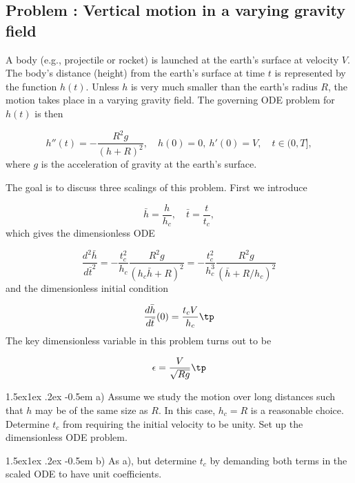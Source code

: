 \documentclass[graybox,envcountchap,sectrefs,final]{svmonodo}
\makeatletter
\newenvironment{doconceexercise}{}{}
\newcounter{doconceexercisecounter}
\newcommand\subex{\@startsection{paragraph}{4}{\z@}%
                  {1.5ex\@plus1ex \@minus.2ex}%
                  {-0.5em}%
                  {\normalfont\normalsize\bfseries}}
\makeatother
\begin{document}
\begin{doconceexercise}

\subsection*{Problem \thedoconceexercisecounter: Vertical motion in a varying gravity field}

\label{scale:vib:exer:rocket}

A body (e.g., projectile or rocket) is launched at the earth's surface
at velocity $V$. The body's distance (height) from the earth's surface
at time $t$ is represented by the function $h(t)$.
Unless $h$ is very much smaller than the earth's radius $R$, the motion
takes place in a varying gravity field. The governing ODE problem for
$h(t)$ is then

\begin{equation}
h''(t) = -\frac{R^2g}{(h+R)^2},\quad h(0)=0,\ h'(0)=V,\quad t\in (0,T],
\end{equation}
where $g$ is the acceleration of gravity at the earth's surface.

The goal is to discuss three scalings of this problem. First we introduce

\[ \bar h = \frac{h}{h_c},\quad \bar t = \frac{t}{t_c},\]
which gives the dimensionless ODE

\[
\frac{d^2\bar h}{d\bar t^2} = -\frac{t_c^2}{h_c}\frac{R^2g}{(h_c\bar h+R)^2}
= -\frac{t_c^2}{h_c^3}\frac{R^2g}{\left(\bar h+ R/h_c\right)^2}
\]
and the dimensionless initial condition

\[ \frac{d\bar h}{d\bar t}(0) = \frac{t_cV}{h_c}\tp\]
The key dimensionless variable in this problem turns out to be

\[ \epsilon = \frac{V}{\sqrt{Rg}}\tp\]


\subex{a)}
Assume we study the motion over long distances such that
$h$ may be of the same size as $R$. In this case, $h_c=R$ is a
reasonable choice. Determine $t_c$ from requiring the initial velocity
to be unity. Set up the dimensionless ODE problem.



\subex{b)}
As a), but determine $t_c$ by demanding both terms in the scaled ODE to
have unit coefficients.




\end{doconceexercise}
\end{document}
